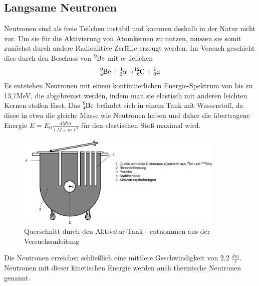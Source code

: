	\subsection{Langsame Neutronen}
Neutronen sind als freie Teilchen instabil und kommen deshalb in der Natur nicht vor. Um sie für die Aktivierung von Atomkernen zu nutzen, müssen sie somit zunächst durch andere Radioaktive Zerfälle erzeugt werden. Im Versuch geschieht dies durch den Beschuss von $\ce{^9Be}$ mit $\alpha$-Teilchen
\begin{align}
	\ce{^9_4 Be + ^4_2\alpha \bond{->} ^{12}_6 C + ^1_0n}
\end{align}
Es entstehen Neutronen mit einem kontinuierlichen Energie-Spektrum von bis zu 13,7MeV, die abgebremst werden, indem man sie elastisch mit anderen leichten Kernen stoßen lässt. Das $\ce{^9_4 Be}$ befindet sich in einem Tank mit Wasserstoff, da diese in etwa die gleiche Masse wie Neutronen haben und daher die übertragene Energie $E = E_0 \frac{4Mm}{(M+m)^2}$ für den elastischen Stoß maximal wird.
\begin{figure}[H]
\includegraphics[width=10cm] {pics/aktivator.png}
\caption{Querschnitt durch den Aktivator-Tank - entnommen aus der Versuchsanleitung}
\end{figure}
Die Neutronen erreichen schließlich eine mittlere Geschwindigkeit von 2,2 $\frac{km}{s}$. Neutronen mit dieser kinetischen Energie werden auch thermische Neutronen genannt.
